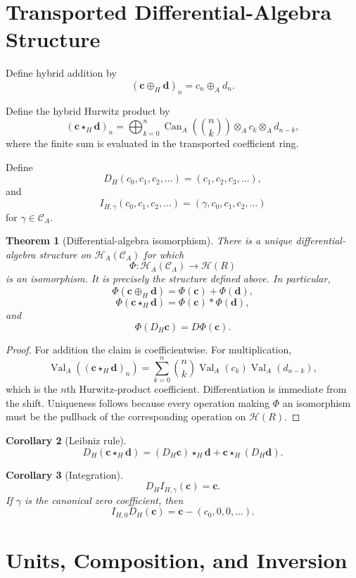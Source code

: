 \documentclass[11pt]{article}
\newtheorem{theorem}{Theorem}[section]
\newtheorem{corollary}[theorem]{Corollary}
\newcommand{\HA}{\mathcal H_A}
\newcommand{\HR}{\mathcal H}
\newcommand{\CA}{\mathcal C_A}
\newcommand{\Val}{\operatorname{Val}_A}
\newcommand{\Can}{\operatorname{Can}_A}
\begin{document}
\section{Transported Differential-Algebra Structure}

Define hybrid addition by
\[
(\mathbf c\oplus_H\mathbf d)_n
=
c_n\oplus_A d_n.
\]

Define the hybrid Hurwitz product by
\[
(\mathbf c\star_H\mathbf d)_n
=
\bigoplus_{k=0}^{n}
\Can\!\left(
\binom{n}{k}
\right)
\otimes_A c_k\otimes_A d_{n-k},
\]
where the finite sum is evaluated in the transported coefficient ring.

Define
\[
D_H(c_0,c_1,c_2,\ldots)
=
(c_1,c_2,c_3,\ldots),
\]
and
\[
I_{H,\gamma}(c_0,c_1,c_2,\ldots)
=
(\gamma,c_0,c_1,c_2,\ldots)
\]
for $\gamma\in\CA$.

\begin{theorem}[Differential-algebra isomorphism]
There is a unique differential-algebra structure on $\HA(\CA)$ for which
\[
\Phi:\HA(\CA)\to\HR(R)
\]
is an isomorphism.  It is precisely the structure defined above.  In particular,
\[
\Phi(\mathbf c\oplus_H\mathbf d)
=
\Phi(\mathbf c)+\Phi(\mathbf d),
\]
\[
\Phi(\mathbf c\star_H\mathbf d)
=
\Phi(\mathbf c)*\Phi(\mathbf d),
\]
and
\[
\Phi(D_H\mathbf c)=D\Phi(\mathbf c).
\]
\end{theorem}

\begin{proof}
For addition the claim is coefficientwise.  For multiplication,
\[
\Val((\mathbf c\star_H\mathbf d)_n)
=
\sum_{k=0}^{n}
\binom{n}{k}
\Val(c_k)\Val(d_{n-k}),
\]
which is the $n$th Hurwitz-product coefficient.  Differentiation is immediate from the shift.  Uniqueness follows because every operation making $\Phi$ an isomorphism must be the pullback of the corresponding operation on $\HR(R)$.
\end{proof}

\begin{corollary}[Leibniz rule]
\[
D_H(\mathbf c\star_H\mathbf d)
=
(D_H\mathbf c)\star_H\mathbf d
+
\mathbf c\star_H(D_H\mathbf d).
\]
\end{corollary}

\begin{corollary}[Integration]
\[
D_H I_{H,\gamma}(\mathbf c)=\mathbf c.
\]
If $\gamma$ is the canonical zero coefficient, then
\[
I_{H,0}D_H(\mathbf c)
=
\mathbf c-(c_0,0,0,\ldots).
\]
\end{corollary}

\section{Units, Composition, and Inversion}
\end{document}
